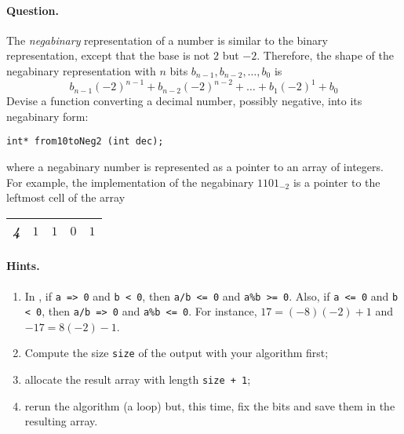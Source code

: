 \paragraph{Question.} The \emph{negabinary} representation of a number
is similar to the binary representation, except that the base is not
\(2\) but \(-2\). Therefore, the shape of the negabinary
representation with \(n\) bits \(b_{n-1}, b_{n-2}, \dots, b_0\) is
\[
b_{n-1}(-2)^{n-1} + b_{n-2}(-2)^{n-2} + \dots + b_1(-2)^1 + b_0
\]
Devise a \C function converting a decimal number, possibly negative,
into its negabinary form: 
{\small
\begin{verbatim}
int* from10toNeg2 (int dec);
\end{verbatim}
}
\noindent where a negabinary number is represented as a pointer to an
array of integers. For example, the implementation of the negabinary
\(1101_{-2}\) is a pointer to the leftmost cell of the array
\begin{center}
\begin{tabular}{|c|c|c|c|c|}
\hline
\emph{\textbf{4}} & \(1\) & \(1\) & \(0\) & \(1\)\\
\hline
\end{tabular}
\end{center}

\paragraph{Hints.}
\begin{enumerate}

   \item In \C, if \texttt{a => 0} and \texttt{b < 0},
     then \texttt{a/b <= 0} and \texttt{a\%b >= 0}. Also, if \texttt{a
     <= 0} and \texttt{b < 0}, then \texttt{a/b => 0} and \texttt{a\%b
     <= 0}. For instance, \(17 = (-8)(-2) + 1\) and \(-17 = 8(-2) - 1\).

  \item Compute the size \texttt{size} of the output with your
  algorithm first;

  \item allocate the result array with length \texttt{size + 1};

  \item rerun the algorithm (a loop) but, this time, fix the bits and
    save them in the resulting array.

\end{enumerate}


